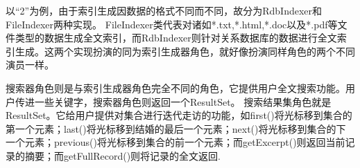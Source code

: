 \documentclass[../main.tex]{subfiles}
\begin{document}
以``2''为例，由于索引生成因数据的格式不同而不同，故分为RdbIndexer和FileIndexer两种实现。 FileIndexer类代表对诸如*.txt,*.html,*.doc以及*.pdf等文件类型的数据生成全文索引，而RdbIndexer则针对关系数据库的数据进行全文索引生成。这两个实现扮演的同为索引生成器角色，就好像扮演同样角色的两个不同演员一样。

搜索器角色则是与索引生成器角色完全不同的角色，它提供用户全文搜索功能。用户传进一些关键字，搜索器角色则返回一个ResultSet。
搜索结果集角色就是ResultSet。它给用户提供对集合进行迭代走访的功能，如first()将光标移到集合的第一个元素；last()将光标移到结婚的最后一个元素；next()将光标移到集合的下一个元素；previous()将光标移到集合的前一个元素；而getExcerpt()则返回当前记录的摘要；而getFullRecord()则将记录的全文返回.
\end{document}
